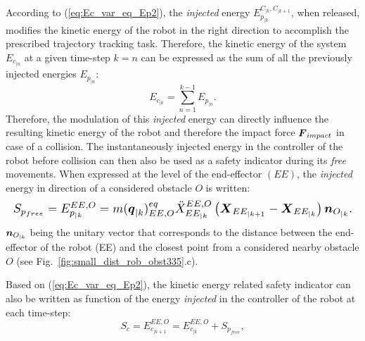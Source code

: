 \documentclass[letterpaper, 10 pt, conference]{ieeeconf}      %
\newcommand{\vect}[1]{\mbox{\boldmath${#1}$}}%
\begin{document}
According to (\ref{eq:Ec_var_eq_Ep2}), the \textit{injected} energy $E_{p_{|k}}^{C_{|k},C_{|k+1}}$, when released, modifies the kinetic energy of the robot in the right direction to accomplish the prescribed trajectory tracking task. Therefore, the kinetic energy of the system $E_{c_{|n}}$ at a given time-step $k = n$ can be expressed as the sum of all the previously injected energies $E_{p_{|n}}$: 
\begin{equation}
E_{c_{|k}} = \sum\limits_{n=1}^{k-1} E_{p_{|n}}.
\label{eq:Ec_eq_sum_Ep_a}
\end{equation}
Therefore, the modulation of this \textit{injected} energy can directly influence the resulting kinetic energy of the robot and therefore the impact force $\vect{F}_{impact}$ in case of a collision. The instantaneously injected energy in the controller of the robot before collision can then also be used as a safety indicator during its \textit{free} movements. When expressed at the level of the end-effector $(EE)$, the \textit{injected} energy in direction of a considered obstacle $O$ is written:
\begin{equation}
\resizebox{1\hsize}{!}{$
S_{p_{free}} = E_{p_{|k}}^{EE,O} 
= m(\vect{q}_{|k})_{EE,O}^{eq} \ddot{X}_{EE_{|k}}^{EE,O} \left(\vect{X}_{EE_{|k+1}} - \vect{X}_{EE_{|k}}\right) \vect{n}_{O_{|k}}.$}
\label{eq:Sp_free_mvts}
\end{equation}
$\vect{n}_{O_{|k}}$ being the unitary vector that corresponds to the distance between the end-effector of the robot (EE) and the closest point from a considered nearby obstacle $O$ (see Fig.~\ref{fig:small_dist_rob_obst335}.c).

Based on (\ref{eq:Ec_var_eq_Ep2}), the kinetic energy related safety indicator can also be written as function of the energy \textit{injected} in the controller of the robot at each time-step: 
\begin{equation}
S_c = E_{c_{|k+1}}^{EE,O} = E_{c_{|k}}^{EE,O} + S_{p_{free}},
\label{eq:second_constr_on_Ec}
\end{equation}
 
\end{document}
